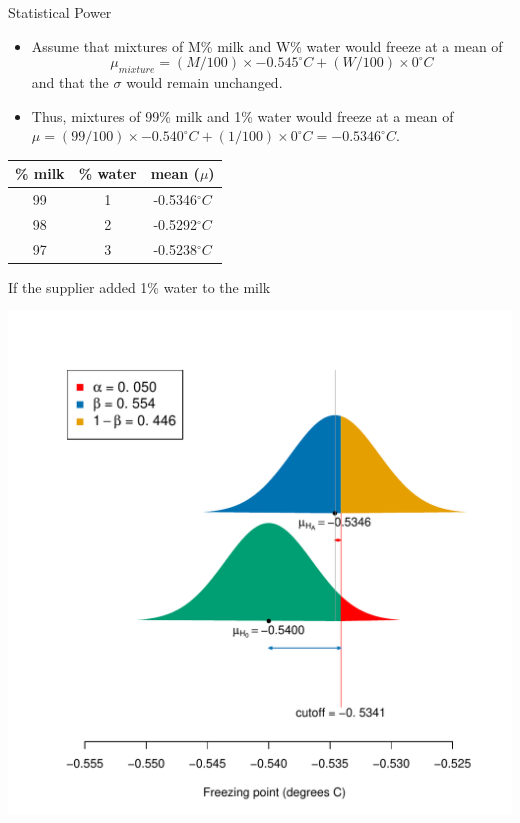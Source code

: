 \documentclass[10pt]{beamer}\usepackage[]{graphicx}\usepackage[]{color}
\makeatletter
\def\maxwidth{ %
  \ifdim\Gin@nat@width>\linewidth
    \linewidth
  \else
    \Gin@nat@width
  \fi
}
\newenvironment{knitrout}{}{} %
\makeatother
\begin{document}
\begin{frame}{Statistical Power}
	\small
	\begin{itemize}
		\setlength\itemsep{1em}
		\item Assume that  mixtures of M\% milk and W\% water  would freeze at a mean of $$\mu_{mixture} =  (M/100) \times -0.545^{\circ}C + (W/100) \times 0 ^{\circ}C$$ and that the $\sigma$ would remain unchanged. \pause 
		\item Thus, mixtures of 99\% milk and 1\% water  would freeze at a mean of $\mu =  (99/100) \times -0.540^{\circ}C + (1/100) \times 0 ^{\circ}C = -0.5346 ^{\circ} C.$ 
	\end{itemize}
	
	\begin{center}
		\begin{tabular}{|c|c|c|}
			\hline 
			\% milk & \% water & mean ($\mu$) \\ 
			\hline 
			99 & 1 & -0.5346$^{\circ}C$ \\ 
			98 & 2 & -0.5292$^{\circ}C$ \\ 
			97 & 3 & -0.5238$^{\circ}C$ \\ 
			\hline 
		\end{tabular} 
	\end{center}
\end{frame}


\begin{frame}[fragile]{If the supplier added 1\% water to the milk}
\begin{knitrout}\tiny
{}\color{fgcolor}

{\centering \includegraphics[width=\maxwidth]{figure/unnamed-chunk-8-1} 

}


\end{knitrout}
\end{frame}
\end{document}
